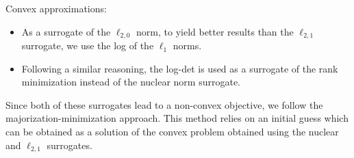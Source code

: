 \documentclass{article}
\begin{document}
Convex approximations:
\begin{itemize}
  \item As a surrogate of the $\ell_{2,0}$ norm, to yield better results than the $\ell_{2,1}$ surrogate, we use the log of the $\ell_{1}$ norms.
  \item Following a similar reasoning, the log-det is used as a surrogate of the rank minimization instead of the nuclear norm surrogate.
\end{itemize}

Since both of these surrogates lead to a non-convex objective, we follow the majorization-minimization approach. This method relies on an initial guess which can be obtained as a solution of the convex problem obtained using the nuclear and $\ell_{2,1}$ surrogates.
\end{document}
